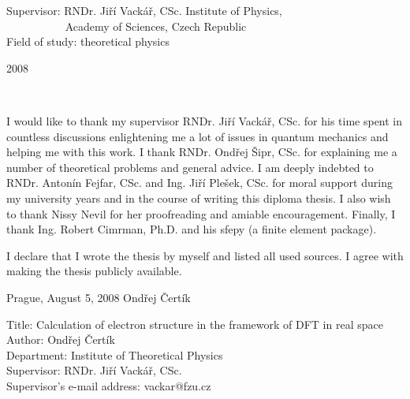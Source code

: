 \documentclass[12pt,notitlepage]{report}
\begin{document}
\begin{titlepage}
\large
\noindent Supervisor: RNDr. Jiří Vackář, CSc. Institute of Physics, \\
\hbox{$\quad\quad\quad\quad\quad$}   Academy of Sciences, Czech Republic
\vspace{1mm}\\
%
\noindent Field of study: theoretical physics
\bigskip
\bigskip
\begin{center}
2008
\end{center}

\end{titlepage}

\normalsize
\setcounter{page}{2}
\ \vspace{10mm}

\noindent I would like to thank my supervisor RNDr. Jiří Vackář, CSc. for
his time spent in countless discussions enlightening me a lot of issues in
quantum mechanics and helping me with this work. I thank RNDr. Ondřej
Šipr, CSc. for explaining me a number of theoretical problems and general
advice. I am deeply indebted to RNDr. Antonín Fejfar, CSc. and Ing. Jiří
Plešek, CSc. for moral support during my university years and in the
course of writing this diploma thesis. I also wish to thank Nissy Nevil
for
her proofreading and amiable encouragement. Finally, I thank Ing. Robert
Cimrman, Ph.D. and his sfepy (a finite element package).

\vspace{\fill}
\noindent I declare that I wrote the thesis by myself and listed all used
sources. I agree with making the thesis publicly available.

\bigskip
\noindent Prague, August 5, 2008 \hspace{\fill}Ondřej Čertík\\ %



\newpage %

\noindent
Title: Calculation of electron structure in the framework of DFT in real
space\\
Author: Ondřej Čertík\\
Department: Institute of Theoretical Physics\\
Supervisor: RNDr. Jiří Vackář, CSc.\\
Supervisor's e-mail address: vackar@fzu.cz\\
\end{document}
